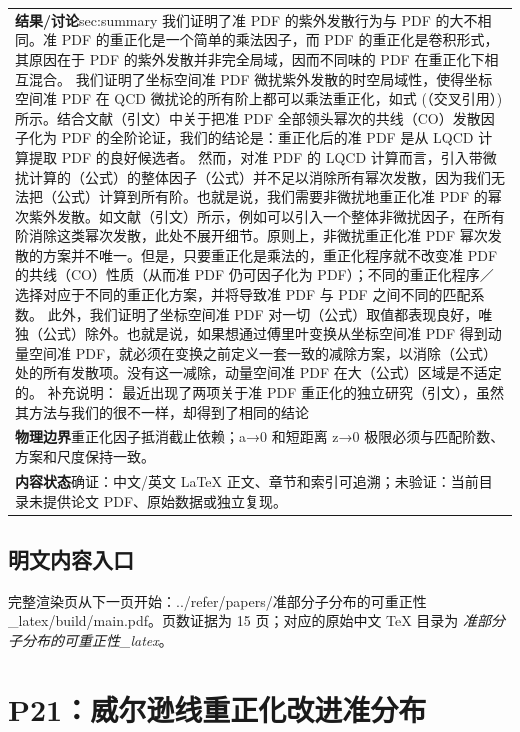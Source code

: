 \documentclass[UTF8,11pt,oneside]{ctexbook}
\begin{document}
\begin{table}[htbp]
\begin{tabular}{@{}p{}@{}}
    \textbf{结果/讨论}\quad sec:summary 我们证明了准 PDF 的紫外发散行为与 PDF 的大不相同。准 PDF 的重正化是一个简单的乘法因子，而 PDF 的重正化是卷积形式，其原因在于 PDF 的紫外发散并非完全局域，因而不同味的 PDF 在重正化下相互混合。 我们证明了坐标空间准 PDF 微扰紫外发散的时空局域性，使得坐标空间准 PDF 在 QCD 微扰论的所有阶上都可以乘法重正化，如式 (（交叉引用）) 所示。结合文献（引文）中关于把准 PDF 全部领头幂次的共线（CO）发散因子化为 PDF 的全阶论证，我们的结论是：重正化后的准 PDF 是从 LQCD 计算提取 PDF 的良好候选者。 然而，对准 PDF 的 LQCD 计算而言，引入带微扰计算的（公式）的整体因子（公式）并不足以消除所有幂次发散，因为我们无法把（公式）计算到所有阶。也就是说，我们需要非微扰地重正化准 PDF 的幂次紫外发散。如文献（引文）所示，例如可以引入一个整体非微扰因子，在所有阶消除这类幂次发散，此处不展开细节。原则上，非微扰重正化准 PDF 幂次发散的方案并不唯一。但是，只要重正化是乘法的，重正化程序就不改变准 PDF 的共线（CO）性质（从而准 PDF 仍可因子化为 PDF）；不同的重正化程序／选择对应于不同的重正化方案，并将导致准 PDF 与 PDF 之间不同的匹配系数。 此外，我们证明了坐标空间准 PDF 对一切（公式）取值都表现良好，唯独（公式）除外。也就是说，如果想通过傅里叶变换从坐标空间准 PDF 得到动量空间准 PDF，就必须在变换之前定义一套一致的减除方案，以消除（公式）处的所有发散项。没有这一减除，动量空间准 PDF 在大（公式）区域是不适定的。 补充说明： 最近出现了两项关于准 PDF 重正化的独立研究（引文），虽然其方法与我们的很不一样，却得到了相同的结论 \\
    \textbf{物理边界}\quad 重正化因子抵消截止依赖；a→0 和短距离 z→0 极限必须与匹配阶数、方案和尺度保持一致。 \\
    \textbf{内容状态}\quad 确证：中文/英文 LaTeX 正文、章节和索引可追溯；未验证：当前目录未提供论文 PDF、原始数据或独立复现。 \\
    \bottomrule
  \end{tabular}
\end{table}
\section*{明文内容入口}
\noindent 完整渲染页从下一页开始：../\allowbreak{}refer/\allowbreak{}papers/\allowbreak{}准部分子分布的可重正性\_\allowbreak{}latex/\allowbreak{}build/\allowbreak{}main.pdf。页数证据为 15 页；对应的原始中文 TeX 目录为 \emph{准部分子分布的可重正性\_latex}。
\clearpage

\clearpage

\chapter{P21：威尔逊线重正化改进准分布}
\end{document}
